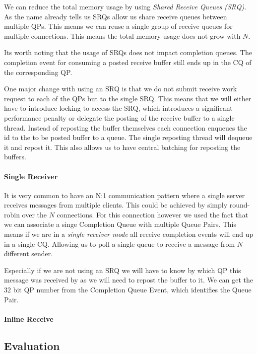 We can reduce the total memory usage by using \emph{Shared Receive Queues (SRQ)}. As the name already tells us SRQs allow us
share receive queues between multiple QPs. This means we can reuse a single group of receive queues for multiple connections.
This means the total memory usage does not grow with $N$.

Its worth noting that the usage of SRQs does not impact completion queues. The completion event for consuming a posted receive
buffer still ends up in the CQ of the corresponding QP.

One major change with using an SRQ is that we do not submit receive work request to each of the QPs but to the single SRQ. This
means that we will either have to introduce locking to access the SRQ, which introduces a significant performance penalty or 
delegate the posting of the receive buffer to a single thread. Instead of reposting the buffer themselves each connection 
enqueues the id to the to be posted buffer to a queue. The single reposting thread will dequeue it and repost it. This also
allows us to have central batching for reposting the buffers.

\paragraph{Single Receiver} It is very common to have an N:1 communication pattern where a single server receives messages 
from multiple clients. This could be achieved by simply round-robin over the $N$ connections. For this connection however 
we used the fact that we can associate a singe Completion Queue with multiple Queue Pairs. This means if we are in a
\emph{single receiver mode} all receive completion events will end up in a single CQ. Allowing us to poll a single queue to
receive a message from $N$ different sender.

Especially if we are not using an SRQ we will have to know by which QP this message was received by as we will need to repost
the buffer to it. We can get the 32 bit QP number from the Completion Queue Event, which identifies the Queue Pair. 

\paragraph{Inline Receive} 

\subsection{Evaluation} \label{conn:send:eval}

